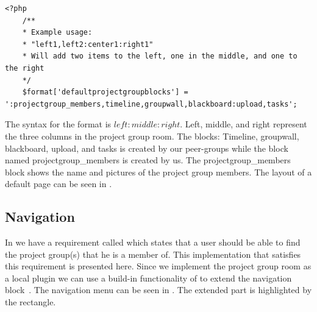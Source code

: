 \begin{lstlisting}[style=phpCode, caption=\myCaption{The default block configuration}, label=moodledaultblock]
<?php
	/**
	* Example usage:
	* "left1,left2:center1:right1"
	* Will add two items to the left, one in the middle, and one to the right
	*/
	$format['defaultprojectgroupblocks'] = ':projectgroup_members,timeline,groupwall,blackboard:upload,tasks';
\end{lstlisting}
The syntax for the format is $left:middle:right$. 
Left, middle, and right represent the three columns in the project group room. 
The blocks: Timeline, groupwall, blackboard, upload, and tasks is created by our peer-groups while the block named projectgroup\_members is created by us. 
The projectgroup\_members block shows the name and pictures of the project group members. 
The layout of a default page can be seen in .

	
	






\subsection{Navigation}
In  we have a requirement called  which states that a user should be able to find the project group(s) that he is a member of.
This implementation that satisfies this requirement is presented here.
Since we implement the project group room as a local plugin we can use a build-in functionality of \moodle{} to extend the navigation block~\cite{moodleextendnavigationblock}.
The navigation menu can be seen in .
The extended part is highlighted by the rectangle. 

